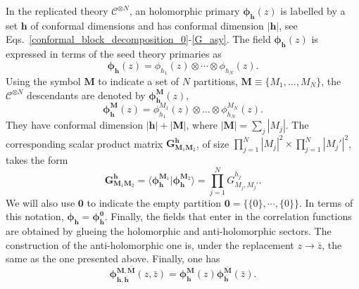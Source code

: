 \documentclass[a4paper,11pt]{article}
\begin{document}
In the replicated theory $\mathcal{C}^{\otimes N}$, an holomorphic primary $\boldsymbol{\phi}_{\boldsymbol{h}}(z)$ is labelled by a set $\boldsymbol{h}$ of conformal dimensions and has conformal dimension $|\boldsymbol{h}|$, see Eqs.~\eqref{conformal_block_decomposition_0}-\eqref{G_asy}. The field $\boldsymbol{\phi}_{\boldsymbol{h}}(z)$ is expressed in terms of the seed theory primaries as
\begin{equation}
\boldsymbol{\phi}_{\boldsymbol{h}}(z)=\phi_{h_1}(z)\otimes \cdots\otimes \phi_{h_N}(z).
\end{equation}
Using the symbol $\boldsymbol{M}$ to indicate a set of $N$ partitions, $\boldsymbol{M}\equiv\{M_1,\dots,M_N\}$,  the  $\mathcal{C}^{\otimes N}$ descendants are denoted by  $\boldsymbol{\phi}^{\boldsymbol{M}}_{\boldsymbol{h}}(z)$,
 \begin{equation}
 \boldsymbol{\phi}_{\boldsymbol{h}}^{\boldsymbol{M}}(z)=\phi_{h_1}^{M_1}(z)\otimes \dots \otimes \phi_{h_N}^{M_N}(z).
\end{equation}
They have conformal dimension $|\boldsymbol{h}|+|\boldsymbol{M}|$, where $|\boldsymbol{M}|=\sum_j |M_j|$. 
The corresponding scalar product matrix $\boldsymbol{G}^{\boldsymbol{h}}_{\boldsymbol{M}_1\boldsymbol{M}_2}$, of size $\prod_{j=1}^{N}|M_j|^2\times \prod_{j=1}^{N}|M_j'|^2$, takes the form
\begin{equation}
\label{scal}
 \boldsymbol{G}^{\boldsymbol{h}}_{\boldsymbol{M}_1\boldsymbol{M}_2}=\langle \boldsymbol{\phi}_{\boldsymbol{h}}^{\boldsymbol{M}_1} | \boldsymbol{\phi}_{\boldsymbol{h}}^{\boldsymbol{M}_2}\rangle=\prod_{j=1}^N G^{h_j}_{M_j,M_j'}.
\end{equation}
We will also use $\boldsymbol{0}$ to indicate the empty partition $\boldsymbol{0}=\{\{0\},\cdots,\{0\}\}$. In terms of this notation, 
$\boldsymbol{\phi}_{\boldsymbol{h}}=\boldsymbol{\phi}_{\boldsymbol{h}}^{\boldsymbol{0}}$. Finally, the fields that enter in the correlation functions are obtained by glueing the holomorphic and anti-holomorphic sectors.  The construction of the anti-holomorphic one is, under the replacement $z\to \bar{z}$, the same as the one presented above. Finally, one has 
\begin{equation}
\boldsymbol{\phi}^{\boldsymbol{M},\boldsymbol{\bar{M}}}_{\boldsymbol{h},\boldsymbol{\bar{h}}} (z,\bar{z})=\boldsymbol{\phi}^{\boldsymbol{M}}_{\boldsymbol{h}}(z)\boldsymbol{\phi}^{\boldsymbol{\bar{M}}}_{\boldsymbol{\bar{h}}}(\bar{z}).
\end{equation} 
\end{document}

